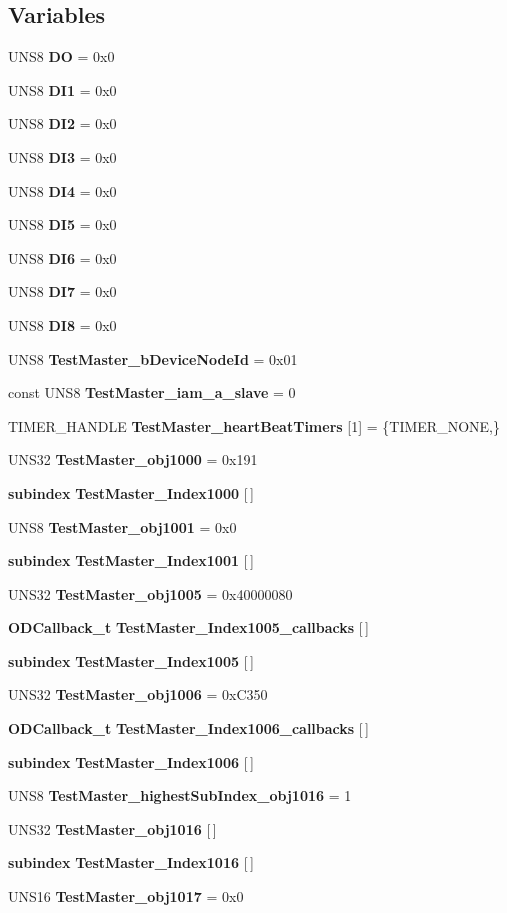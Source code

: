 \subsection*{Variables}
\begin{CompactItemize}
\item 
UNS8 {\bf DO} = 0x0
\item 
UNS8 {\bf DI1} = 0x0
\item 
UNS8 {\bf DI2} = 0x0
\item 
UNS8 {\bf DI3} = 0x0
\item 
UNS8 {\bf DI4} = 0x0
\item 
UNS8 {\bf DI5} = 0x0
\item 
UNS8 {\bf DI6} = 0x0
\item 
UNS8 {\bf DI7} = 0x0
\item 
UNS8 {\bf DI8} = 0x0
\item 
UNS8 {\bf Test\-Master\_\-b\-Device\-Node\-Id} = 0x01
\item 
const UNS8 {\bf Test\-Master\_\-iam\_\-a\_\-slave} = 0
\item 
TIMER\_\-HANDLE {\bf Test\-Master\_\-heart\-Beat\-Timers} [1] = \{TIMER\_\-NONE,\}
\item 
UNS32 {\bf Test\-Master\_\-obj1000} = 0x191
\item 
{\bf subindex} {\bf Test\-Master\_\-Index1000} [$\,$]
\item 
UNS8 {\bf Test\-Master\_\-obj1001} = 0x0
\item 
{\bf subindex} {\bf Test\-Master\_\-Index1001} [$\,$]
\item 
UNS32 {\bf Test\-Master\_\-obj1005} = 0x40000080
\item 
{\bf ODCallback\_\-t} {\bf Test\-Master\_\-Index1005\_\-callbacks} [$\,$]
\item 
{\bf subindex} {\bf Test\-Master\_\-Index1005} [$\,$]
\item 
UNS32 {\bf Test\-Master\_\-obj1006} = 0x\-C350
\item 
{\bf ODCallback\_\-t} {\bf Test\-Master\_\-Index1006\_\-callbacks} [$\,$]
\item 
{\bf subindex} {\bf Test\-Master\_\-Index1006} [$\,$]
\item 
UNS8 {\bf Test\-Master\_\-highest\-Sub\-Index\_\-obj1016} = 1
\item 
UNS32 {\bf Test\-Master\_\-obj1016} [$\,$]
\item 
{\bf subindex} {\bf Test\-Master\_\-Index1016} [$\,$]
\item 
UNS16 {\bf Test\-Master\_\-obj1017} = 0x0
\item 

\end{CompactItemize}
